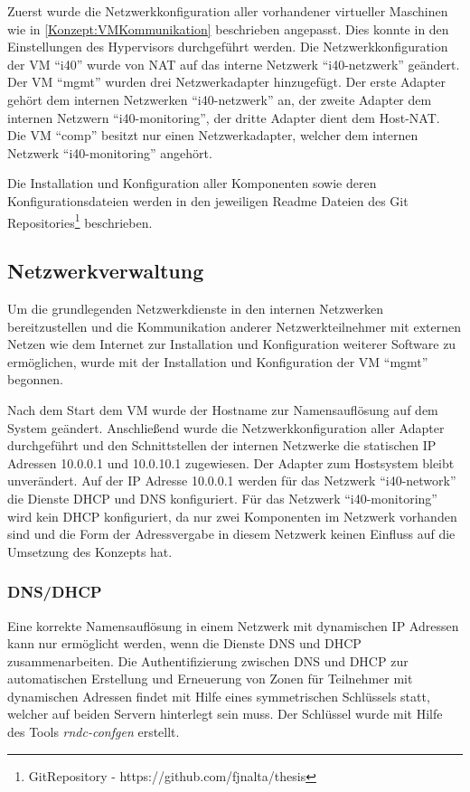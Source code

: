Zuerst wurde die Netzwerkkonfiguration aller vorhandener virtueller Maschinen wie in \autoref{Konzept:VMKommunikation} beschrieben angepasst. Dies konnte in den Einstellungen des Hypervisors durchgeführt werden. Die Netzwerkkonfiguration der \ac{VM} "`i40"' wurde von \ac{NAT} auf das interne Netzwerk "`i40-netzwerk"' geändert. Der \ac{VM} "`mgmt"' wurden drei Netzwerkadapter hinzugefügt. Der erste Adapter gehört dem internen Netzwerken "`i40-netzwerk"' an, der zweite Adapter dem internen Netzwern "`i40-monitoring"', der dritte Adapter dient dem Host-\ac{NAT}. Die \ac{VM} "`comp"' besitzt nur einen Netzwerkadapter, welcher dem internen Netzwerk "`i40-monitoring"' angehört.

Die Installation und Konfiguration aller Komponenten sowie deren Konfigurationsdateien werden in den jeweiligen Readme Dateien des Git Repositories\footnote{GitRepository - https://github.com/fjnalta/thesis} beschrieben.

\subsection{Netzwerkverwaltung}
\label{Umsetzung:Netzwerkverwaltung}
Um die grundlegenden Netzwerkdienste in den internen Netzwerken bereitzustellen und die Kommunikation anderer Netzwerkteilnehmer mit externen Netzen wie dem Internet zur Installation und Konfiguration weiterer Software zu ermöglichen, wurde mit der Installation und Konfiguration der \ac{VM} "`mgmt"' begonnen.

Nach dem Start dem \ac{VM} wurde der Hostname zur Namensauflösung auf dem System geändert. Anschließend wurde die Netzwerkkonfiguration aller Adapter durchgeführt und den Schnittstellen der internen Netzwerke die statischen \ac{IP} Adressen 10.0.0.1 und 10.0.10.1 zugewiesen. Der Adapter zum Hostsystem bleibt unverändert. Auf der \ac{IP} Adresse 10.0.0.1 werden für das Netzwerk "`i40-network"' die Dienste \ac{DHCP} und \ac{DNS} konfiguriert. Für das Netzwerk "`i40-monitoring"' wird kein \ac{DHCP} konfiguriert, da nur zwei Komponenten im Netzwerk vorhanden sind und die Form der Adressvergabe in diesem Netzwerk keinen Einfluss auf die Umsetzung des Konzepts hat. 

\subsubsection{\ac{DNS}/\ac{DHCP}}
Eine korrekte Namensauflösung in einem Netzwerk mit dynamischen \ac{IP} Adressen kann nur ermöglicht werden, wenn die Dienste \ac{DNS} und \ac{DHCP} zusammenarbeiten. Die Authentifizierung zwischen \ac{DNS} und \ac{DHCP} zur automatischen Erstellung und Erneuerung von Zonen für Teilnehmer mit dynamischen Adressen findet mit Hilfe eines symmetrischen Schlüssels statt, welcher auf beiden Servern hinterlegt sein muss. Der Schlüssel wurde mit Hilfe des Tools \textit{rndc-confgen} erstellt.

